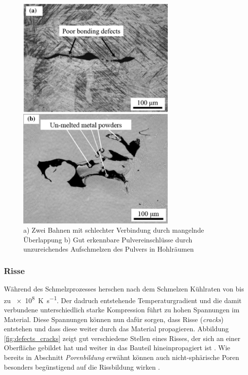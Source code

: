 		\begin{figure}[!ht]
			\centering
			\includegraphics[width=0.7\textwidth]{chapter/main/img/defects/lack_of_fusion.png}
			\caption{a) Zwei Bahnen mit schlechter Verbindung durch mangelnde Überlappung
			b) Gut erkennbare Pulvereinschlüsse durch unzureichendes Aufschmelzen des Pulvers
			in Hohlräumen \cite{zhang2017defect}}
			\label{fig:defects_lof}
		\end{figure}

		\subsubsection{Risse}
		Während des Schmelzprozesses herschen nach dem Schmelzen Kühlraten von bis zu
		\SI{e8}{\kelvin\per\second}. Der dadruch entstehende Temperaturgradient und die damit
		verbundene unterschiedlich starke Kompression führt zu hohen Spannungen im Material.
		Diese Spannungen können nun dafür sorgen, dass Risse (\emph{cracks}) entstehen und dass
		diese weiter durch das Material propagieren. Abbildung \ref{fig:defects_cracks} zeigt gut
		verschiedene Stellen eines Risses, der sich an einer Oberfläche gebildet hat und weiter in
		das Bauteil hineinpropagiert ist \cite{zhang2017defect}. Wie bereits in Abschnitt
		\emph{Porenbildung} erwähnt können auch nicht-sphärische Poren besonders begünstigend auf
		die Rissbildung wirken \cite{galy2018main}.

